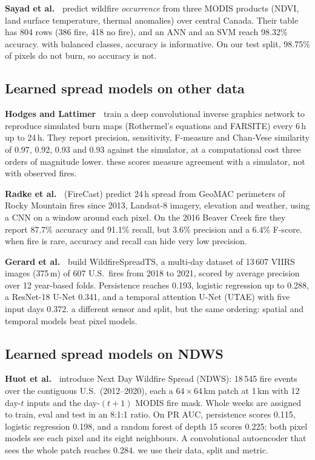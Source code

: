 \textbf{Sayad et al.~\cite{sayad2019}} predict wildfire \emph{occurrence} from three MODIS products (NDVI,
land surface temperature, thermal anomalies) over central Canada. Their table has 804 rows (386 fire, 418
no fire), and an ANN and an SVM reach 98.32\% accuracy. \relevance{} with balanced classes, accuracy is
informative. On our test split, 98.75\% of pixels do not burn, so accuracy is not.

\subsection{Learned spread models on other data}

\textbf{Hodges and Lattimer~\cite{hodges2019}} train a deep convolutional inverse graphics network to
reproduce simulated burn maps (Rothermel's equations and FARSITE) every 6\,h up to 24\,h. They report
precision, sensitivity, F-measure and Chan-Vese similarity of 0.97, 0.92, 0.93 and 0.93 against the
simulator, at a computational cost three orders of magnitude lower. \relevance{} these scores measure
agreement with a simulator, not with observed fires.

\textbf{Radke et al.~\cite{radke2019}} (FireCast) predict 24\,h spread from GeoMAC perimeters of Rocky
Mountain fires since 2013, Landsat-8 imagery, elevation and weather, using a CNN on a window around each
pixel. On the 2016 Beaver Creek fire they report 87.7\% accuracy and 91.1\% recall, but 3.6\% precision
and a 6.4\% F-score. \relevance{} when fire is rare, accuracy and recall can hide very low precision.

\textbf{Gerard et al.~\cite{gerard2023}} build WildfireSpreadTS, a multi-day dataset of 13\,607 VIIRS
images (375\,m) of 607 U.S.\ fires from 2018 to 2021, scored by average precision over 12 year-based folds.
Persistence reaches 0.193, logistic regression up to 0.288, a ResNet-18 U-Net 0.341, and a temporal
attention U-Net (UTAE) with five input days 0.372. \relevance{} a different sensor and split, but the same
ordering: spatial and temporal models beat pixel models.

\subsection{Learned spread models on NDWS}

\textbf{Huot et al.~\cite{huot2022}} introduce Next Day Wildfire Spread (NDWS): 18\,545 fire events over
the contiguous U.S.\ (2012--2020), each a $64\times64$\,km patch at 1\,km with 12 day-$t$ inputs and the
day-$(t{+}1)$ MODIS fire mask. Whole weeks are assigned to train, eval and test in an 8:1:1 ratio. On PR
AUC, persistence scores 0.115, logistic regression 0.198, and a random forest of depth 15 scores 0.225;
both pixel models see each pixel and its eight neighbours. A convolutional autoencoder that sees the
whole patch reaches 0.284. \relevance{} we use their data, split and metric.

